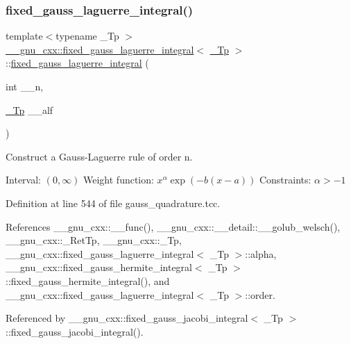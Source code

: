 \subsubsection{\texorpdfstring{fixed\+\_\+gauss\+\_\+laguerre\+\_\+integral()}{fixed\_gauss\_laguerre\_integral()}}
{\footnotesize\ttfamily template$<$typename \+\_\+\+Tp $>$ \\
\hyperlink{struct____gnu__cxx_1_1fixed__gauss__laguerre__integral}{\+\_\+\+\_\+gnu\+\_\+cxx\+::fixed\+\_\+gauss\+\_\+laguerre\+\_\+integral}$<$ \hyperlink{namespace____gnu__cxx_a3b19a9c800ca194374ef9172290f7d79}{\+\_\+\+Tp} $>$\+::\hyperlink{struct____gnu__cxx_1_1fixed__gauss__laguerre__integral}{fixed\+\_\+gauss\+\_\+laguerre\+\_\+integral} (\begin{DoxyParamCaption}\item[{int}]{\+\_\+\+\_\+n,  }\item[{\hyperlink{namespace____gnu__cxx_a3b19a9c800ca194374ef9172290f7d79}{\+\_\+\+Tp}}]{\+\_\+\+\_\+alf }\end{DoxyParamCaption})\hspace{0.3cm}{\ttfamily [explicit]}}

Construct a Gauss-\/\+Laguerre rule of order {\ttfamily n}.

Interval\+: $ (0, \infty) $ Weight function\+: $ x^\alpha \exp(-b(x-a)) $ Constraints\+: $ \alpha > -1 $ 

Definition at line 544 of file gauss\+\_\+quadrature.\+tcc.



References \+\_\+\+\_\+gnu\+\_\+cxx\+::\+\_\+\+\_\+func(), \+\_\+\+\_\+gnu\+\_\+cxx\+::\+\_\+\+\_\+detail\+::\+\_\+\+\_\+golub\+\_\+welsch(), \+\_\+\+\_\+gnu\+\_\+cxx\+::\+\_\+\+Ret\+Tp, \+\_\+\+\_\+gnu\+\_\+cxx\+::\+\_\+\+Tp, \+\_\+\+\_\+gnu\+\_\+cxx\+::fixed\+\_\+gauss\+\_\+laguerre\+\_\+integral$<$ \+\_\+\+Tp $>$\+::alpha, \+\_\+\+\_\+gnu\+\_\+cxx\+::fixed\+\_\+gauss\+\_\+hermite\+\_\+integral$<$ \+\_\+\+Tp $>$\+::fixed\+\_\+gauss\+\_\+hermite\+\_\+integral(), and \+\_\+\+\_\+gnu\+\_\+cxx\+::fixed\+\_\+gauss\+\_\+laguerre\+\_\+integral$<$ \+\_\+\+Tp $>$\+::order.



Referenced by \+\_\+\+\_\+gnu\+\_\+cxx\+::fixed\+\_\+gauss\+\_\+jacobi\+\_\+integral$<$ \+\_\+\+Tp $>$\+::fixed\+\_\+gauss\+\_\+jacobi\+\_\+integral().


